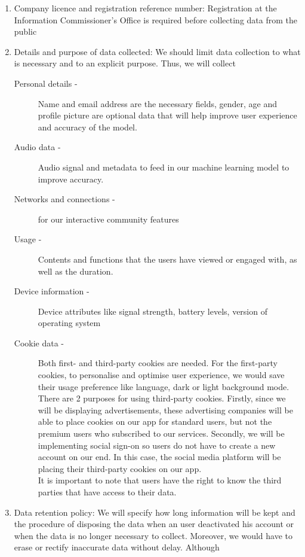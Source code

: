 \begin{enumerate}
    \item Company licence and registration reference number: Registration at the Information Commissioner's Office is required
    before collecting data from the public
    \item Details and purpose of data collected: We should limit data collection to what is necessary and to an explicit purpose.
    Thus, we will collect
    \begin{description}
        \item[Personal details -] Name and email address are the necessary fields, gender, age and profile picture are optional data
        that will help improve user experience and accuracy of the model. 
        \item[Audio data -] Audio signal and metadata to feed in our machine learning model to improve accuracy.
        \item[Networks and connections -] for our interactive community features
        \item[Usage -] Contents and functions that the users have viewed or engaged with, as well as the duration.
        \item[Device information -] Device attributes like signal strength, battery levels, version of operating system
        \item[Cookie data -] Both first- and third-party cookies are needed. For the first-party cookies, to personalise and optimise user
        experience, we would save their usage preference like language, dark or light background mode. 
        \\There are 2 purposes for using third-party cookies. Firstly, since we will be displaying advertisements, 
        these advertising companies will be able to place cookies on our app for standard users, but not the premium users who subscribed to our services. 
        Secondly, we will be implementing social sign-on so users do not have to create a new account on our end. In this case, the social media 
        platform will be placing their third-party cookies on our app.
        \\It is important to note that users have the right to know the third parties that have access to their data.
    \end{description}
    \item Data retention policy: We will specify how long information will be kept and the procedure of disposing the data when an user deactivated
    his account or when the data is no longer necessary to collect. Moreover, we would have to erase or rectify inaccurate data without delay. Although 

\end{enumerate}
